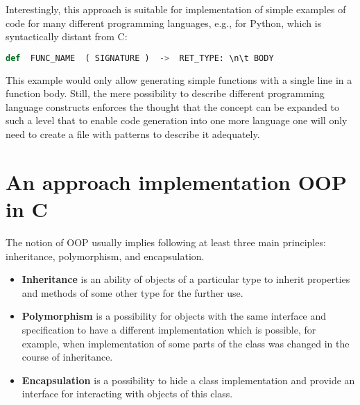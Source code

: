 Interestingly, this approach is suitable for implementation of simple examples of code for many different programming languages, e.g., for Python, which is syntactically distant from C:

\begin{lstlisting}[language=Python, numbers=none ]
    def  FUNC_NAME  ( SIGNATURE )  ->  RET_TYPE: \n\t BODY
\end{lstlisting}


This example would only allow generating simple functions with a single line in a function body. Still, the mere possibility to describe different programming language constructs enforces the thought that the concept can be expanded to such a level that to enable code generation into one more language one will only need to create a file with patterns to describe it adequately.




\section{An approach implementation OOP in C}
The notion of OOP usually implies following at least three main principles: inheritance, polymorphism, and encapsulation.

\begin{itemize}
    \item \textbf{Inheritance} is an ability of objects of a particular type to inherit properties and methods of some other type for the further use.

    \item \textbf{Polymorphism} is a possibility for objects with the same interface and specification to have a different implementation which is possible, for example, when implementation of some parts of the class was changed in the course of inheritance.

    \item \textbf{Encapsulation} is a possibility to hide a class implementation and provide an interface for interacting with objects of this class.
\end{itemize}

